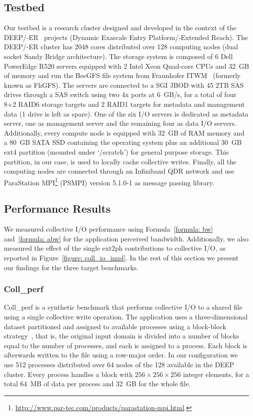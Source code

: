 \subsection{Testbed}
Our testbed is a research cluster designed and developed in the context of the DEEP/-ER~\cite{Eicker2013} projects (Dynamic Exascale Entry Platform/-Extended Reach). The 
DEEP/-ER cluster has 2048 cores distributed over 128 computing nodes (dual socket Sandy Bridge architecture). The storage system is composed of 6 Dell PowerEdge 
R520 servers equipped with 2 Intel Xeon Quad-core CPUs and 32~GB of memory and run the BeeGFS file system from Fraunhofer ITWM~\cite{Mcpeek2002}
(formerly known as FhGFS). The servers are connected to a SGI JBOD with 45 2TB SAS drives through a SAS switch using two 4x ports at 6~GB/s, for a total of four 
8+2 RAID6 storage targets and 2 RAID1 targets for metadata and management data (1 drive is left as spare). One of the six I/O servers is dedicated as metadata 
server, one as management server and the remaining four as data I/O servers.
Additionally, every compute node is equipped with 32~GB of RAM memory and a 80~GB SATA SSD containing the operating system plus an additional 30~GB ext4 partition 
(mounted under `/scratch') for general purpose storage. This partition, in our case, is used to locally cache collective writes. Finally, all the computing nodes 
are connected through an Infiniband QDR network and use ParaStation MPI\footnote{\url{http://www.par-tec.com/products/parastation-mpi.html}.} (PSMPI) version 5.1.0-1 
as message passing library.

\subsection{Performance Results}
We measured collective I/O performance using Formula~\ref{formula: bw} and~\ref{formula: abw} for the application perceived bandwidth. Additionally, we also measured
the effect of the single ext2ph contributions to collective I/O, as reported in Figure~\ref{figure: coll_io_impl}. In the rest of this section we present our findings
for the three target benchmarks.

\subsubsection{Coll\_perf}
Coll\_perf is a synthetic benchmark that performs collective I/O to a shared file using a single collective write operation. The application uses a three-dimensional
dataset partitioned and assigned to available processes using a block-block strategy~\cite{Bordawekar1993}, that is, the original input domain is divided into a number of blocks equal to the 
number of processes, and each is assigned to a process. Each block is afterwards written to the file using a row-major order. In our configuration we use 512 processes 
distributed over 64 nodes of the 128 available in the DEEP cluster. Every process handles a block with $256 \times 256 \times 256$ integer elements, for a total 64~MB of data
per process and 32~GB for the whole file.

